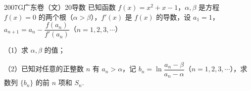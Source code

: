 
\begin{problem}{2007}{G}{广东卷（文）}{20}{导数}
已知函数 $f(x)=x^2+x-1$，$\alpha,\beta$ 是方程 $f(x)=0$ 的两个根（$\alpha>\beta$），$f'(x)$ 是 $f(x)$ 的导数，设 $a_1=1$，$a_{n+1}=a_n-\dfrac{f(a_n)}{f'(a_n)}$（$n=1,2,3,\cdots$）

（1）求 $\alpha,\beta$ 的值；

（2）已知对任意的正整数 $n$ 有 $a_n>\alpha$，记 $b_n=\ln\dfrac{a_n-\beta}{a_n-\alpha}$（$n=1,2,3,\cdots$），求数列 $\{b_n\}$ 的前 $n$ 项和 $S_n$.
\end{problem}